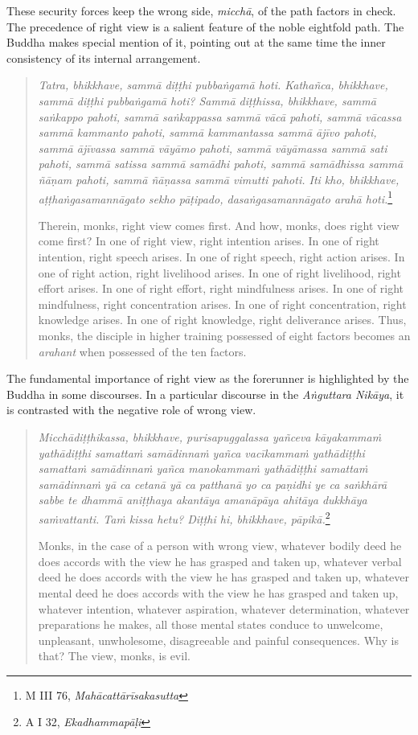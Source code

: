 These security forces keep the wrong side, \emph{micchā}, of the path factors in check. The precedence of right view is a salient feature of the noble eightfold path. The Buddha makes special mention of it, pointing out at the same time the inner consistency of its internal arrangement.

\begin{quote}
\emph{Tatra, bhikkhave, sammā diṭṭhi pubbaṅgamā hoti. Kathañca, bhikkhave, sammā diṭṭhi pubbaṅgamā hoti? Sammā diṭṭhissa, bhikkhave, sammā saṅkappo pahoti, sammā saṅkappassa sammā vācā pahoti, sammā vācassa sammā kammanto pahoti, sammā kammantassa sammā ājīvo pahoti, sammā ājīvassa sammā vāyāmo pahoti, sammā vāyāmassa sammā sati pahoti, sammā satissa sammā samādhi pahoti, sammā samādhissa sammā ñāṇam pahoti, sammā ñāṇassa sammā vimutti pahoti. Iti kho, bhikkhave, aṭṭhaṅgasamannāgato sekho pāṭipado, dasaṅgasamannāgato arahā hoti.}\footnote{M III 76, \emph{Mahācattārīsakasutta}}

Therein, monks, right view comes first. And how, monks, does right view come first? In one of right view, right intention arises. In one of right intention, right speech arises. In one of right speech, right action arises. In one of right action, right livelihood arises. In one of right livelihood, right effort arises. In one of right effort, right mindfulness arises. In one of right mindfulness, right concentration arises. In one of right concentration, right knowledge arises. In one of right knowledge, right deliverance arises. Thus, monks, the disciple in higher training possessed of eight factors becomes an \emph{arahant} when possessed of the ten factors.
\end{quote}

The fundamental importance of right view as the forerunner is highlighted by the Buddha in some discourses. In a particular discourse in the \emph{Aṅguttara Nikāya}, it is contrasted with the negative role of wrong view.

\begin{quote}
\emph{Micchādiṭṭhikassa, bhikkhave, purisapuggalassa yañceva kāyakammaṁ yathādiṭṭhi samattaṁ samādinnaṁ yañca vacīkammaṁ yathādiṭṭhi samattaṁ samādinnaṁ yañca manokammaṁ yathādiṭṭhi samattaṁ samādinnaṁ yā ca cetanā yā ca patthanā yo ca paṇidhi ye ca saṅkhārā sabbe te dhammā aniṭṭhaya akantāya amanāpāya ahitāya dukkhāya saṁvattanti. Taṁ kissa hetu? Diṭṭhi hi, bhikkhave, pāpikā.}\footnote{A I 32, \emph{Ekadhammapāḷi}}

Monks, in the case of a person with wrong view, whatever bodily deed he does accords with the view he has grasped and taken up, whatever verbal deed he does accords with the view he has grasped and taken up, whatever mental deed he does accords with the view he has grasped and taken up, whatever intention, whatever aspiration, whatever determination, whatever preparations he makes, all those mental states conduce to unwelcome, unpleasant, unwholesome, disagreeable and painful consequences. Why is that? The view, monks, is evil.
\end{quote}


